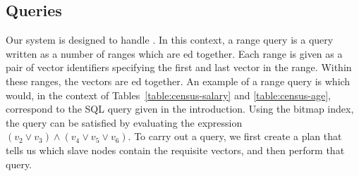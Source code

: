 \subsection{Queries}
Our system is designed to handle . In this context, a range
query is a query written as a number of ranges which are ed together.
Each range is given as a pair of vector identifiers specifying the first and
last vector in the range. Within these ranges, the vectors are ed
together. An example of a range query is  which would,
in the context of Tables~\ref{table:census-salary} and \ref{table:census-age},
correspond to the SQL query
 given in the introduction.
Using the bitmap index, the query can be satisfied by evaluating the expression
\((v_2 \lor v_3) \land (v_4 \lor v_5 \lor v_6)\).
To carry out a query, we first create a plan that tells us which slave nodes
contain the requisite vectors, and then perform that query.
%
